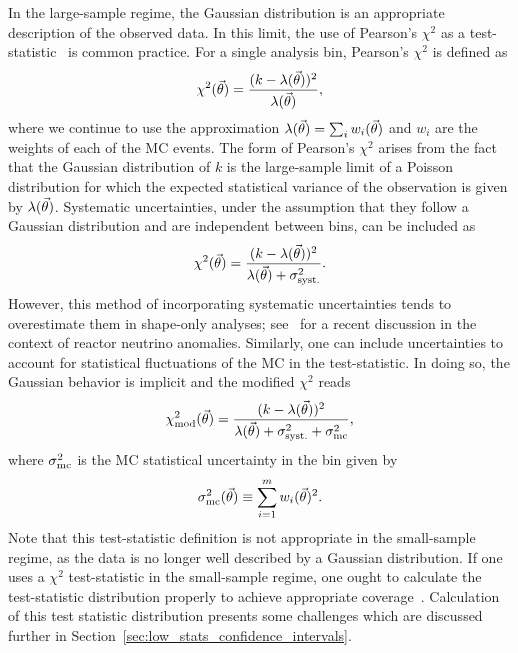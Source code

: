 In the large-sample regime, the Gaussian distribution is an appropriate description of the observed data.
In this limit, the use of Pearson's $\chi^2$ as a test-statistic~\cite{Pearson:1900} is common practice.
For a single analysis bin, Pearson's $\chi^2$ is defined as
\begin{equation}
\chi^2(\vec{\theta}) = \frac{(k - \lambda(\vec{\theta}))^2}{\lambda(\vec{\theta})},
\label{eq:chi2_pearson}
\end{equation}
where we continue to use the approximation $\lambda(\vec{\theta}) = \sum_i{w_i(\vec{\theta})}$ and $w_i$ are the weights of each of the MC events.
The form of Pearson's $\chi^2$ arises from the fact that the Gaussian distribution of $k$ is the large-sample limit of a Poisson distribution for which the expected statistical variance of the observation is given by $\lambda(\vec{\theta})$.
Systematic uncertainties, under the assumption that they follow a Gaussian distribution and are independent between bins, can be included as
\begin{equation}
\chi^2(\vec{\theta}) = \frac{(k - \lambda(\vec{\theta}))^2}{\lambda(\vec{\theta}) + \sigma^2_{\rm syst.}}.
\label{eq:chi2_systematics}
\end{equation}
However, this method of incorporating systematic uncertainties tends to overestimate them in shape-only analyses; see~\cite{Cogswell:2018auu} for a recent discussion in the context of reactor neutrino anomalies.
Similarly, one can include uncertainties to account for statistical fluctuations of the MC in the test-statistic.
In doing so, the Gaussian behavior is implicit and the modified $\chi^2$ reads
\begin{align}
\chi^2_{\rm mod}(\vec{\theta}) = \frac{(k - \lambda(\vec{\theta}))^2}{\lambda(\vec{\theta}) + \sigma^2_{\rm syst.} + \sigma^2_{\rm mc}},
\label{eq:modified_chi2}
\end{align}
where $\sigma^2_{\rm mc}$ is the MC statistical uncertainty in the bin given by
\begin{equation}\label{eq:sigma}
\sigma^2_{\rm mc}(\vec{\theta}) \equiv \sum_{i=1}^m w_i(\vec{\theta})^2.
\end{equation}
Note that this test-statistic definition is not appropriate in the small-sample regime, as the data is no longer well described by a Gaussian distribution.
If one uses a $\chi^2$ test-statistic in the small-sample regime, one ought to calculate the test-statistic distribution properly to achieve appropriate coverage~\cite{cowan1998statistical}.
Calculation of this test statistic distribution presents some challenges which are discussed further in Section~\ref{sec:low_stats_confidence_intervals}.

